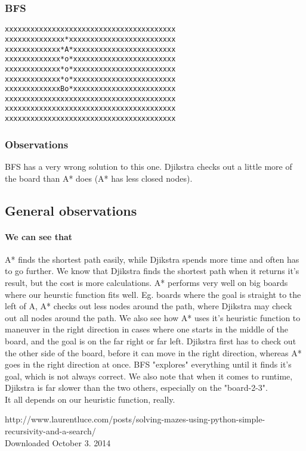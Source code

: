 \documentclass[11pt,a4paper]{article}
\begin{document}
\subsubsection*{BFS}
\begin{lstlisting}
xxxxxxxxxxxxxxxxxxxxxxxxxxxxxxxxxxxxxxxx
xxxxxxxxxxxxxx*xxxxxxxxxxxxxxxxxxxxxxxxx
xxxxxxxxxxxxx*A*xxxxxxxxxxxxxxxxxxxxxxxx
xxxxxxxxxxxxx*o*xxxxxxxxxxxxxxxxxxxxxxxx
xxxxxxxxxxxxx*o*xxxxxxxxxxxxxxxxxxxxxxxx
xxxxxxxxxxxxx*o*xxxxxxxxxxxxxxxxxxxxxxxx
xxxxxxxxxxxxxBo*xxxxxxxxxxxxxxxxxxxxxxxx
xxxxxxxxxxxxxxxxxxxxxxxxxxxxxxxxxxxxxxxx
xxxxxxxxxxxxxxxxxxxxxxxxxxxxxxxxxxxxxxxx
xxxxxxxxxxxxxxxxxxxxxxxxxxxxxxxxxxxxxxxx
\end{lstlisting}
\subsubsection*{Observations}
BFS has a very wrong solution to this one. Djikstra checks out a little more of the board than A* does (A* has less closed nodes).

\subsection*{General observations}
\paragraph{We can see that} A* finds the shortest path easily, while Djikstra spends more time and often has to go further. We know that Djikstra finds the shortest path when it returns it's result, but the cost is more calculations. A* performs very well on big boards where our heurstic function fits well. Eg. boards where the goal is straight to the left of A, A* checks out less nodes around the path, where Djikstra may check out all nodes around the path. We also see how A* uses it's heuristic function to maneuver in the right direction in cases where one starts in the middle of the board, and the goal is on the far right or far left. Djikstra first has to check out the other side of the board, before it can move in the right direction, whereas A* goes in the right direction at once. BFS "explores" everything until it finds it's goal, which is not always correct. We also note that when it comes to runtime, Djikstra is far slower than the two others, especially on the "board-2-3". 
\\ 
It all depends on our heuristic function, really.


\begin{thebibliography}{9}

  http://www.laurentluce.com/posts/solving-mazes-using-python-simple-recursivity-and-a-search/
  \\ Downloaded October 3. 2014

\end{thebibliography}
\end{document}
